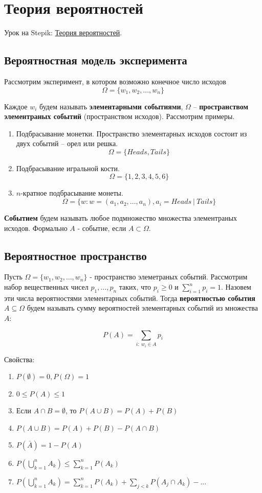 \documentclass{article}
\begin{document}
\section{Теория вероятностей}

Урок на Stepik: \href{https://stepik.org/lesson/56519/step/1?unit=34421}{Теория вероятностей}.

\subsection{Вероятностная модель эксперимента}

Рассмотрим эксперимент, в котором возможно конечное число исходов $$\Omega = \{w_1, w_2, \dots, w_n\}$$

Каждое $w_i$ будем называть \textbf{элементарными событиями}, $\Omega$ -- \textbf{пространством элементраных событий} (пространством исходов). Рассмотрим примеры.

\begin{enumerate}
	\item Подбрасывание монетки. Пространство элементарных исходов состоит из двух событий -- орел или решка. $$\Omega = \{Heads, Tails\}$$
	\item Подбрасывание игральной кости. $$\Omega = \{1, 2, 3, 4, 5, 6\}$$
	\item $n$-кратное подбрасывание монеты. $$\Omega = \{w : w = (a_1, a_2, \dots, a_n), a_i  = Heads \ | \ Tails\}$$
\end{enumerate}

\textbf{Событием} будем называть любое подмножество множества элементраных исходов. Формально $A$ - событие, если $A \subset \Omega$.

\subsection{Вероятностное пространство}

Пусть $\Omega = \{w_1, w_2, \dots, w_n\}$ - пространство элеметраных событий. Рассмотрим набор вещественных чисел $p_1, \dots, p_n$ таких, что $p_i \ge 0$ и $\sum_{i=1}^{n} p_i = 1$. Назовем эти числа вероятностями элементарных событий. Тогда \textbf{вероятностью события} $A \subseteq \Omega$ будем называть сумму вероятностей элементарных событий из множества $A$:

$$ P(A) = \sum_{i: \ w_i \in A} p_i $$

Свойства:

\begin{enumerate}
	\item $P(\emptyset) = 0, P(\Omega) = 1$
	\item $0 \le P(A) \le 1$
	\item Если $A \cap B = \emptyset$, то $P(A \cup B) = P(A) + P(B)$
	\item $P(A \cup B) = P(A) + P(B) - P(A \cap B)$
	\item $P(\bar{A}) = 1 - P(A)$
	\item $P\left(\bigcup_{k = 1}^{n} A_k \right) \le \sum_{k = 1}^{n} P(A_k)$
	\item $P\left(\bigcup_{k = 1}^{n} A_k \right) = \sum_{k = 1}^{n} P(A_k) + \sum_{j < k} P(A_j \cap A_k) - ...$
\end{enumerate}
\end{document}
